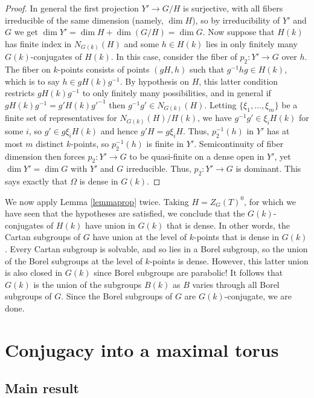 \documentclass[10pt]{article}
\renewcommand{\(}{\left(}
\renewcommand{\)}{\right)}
\numberwithin{thm}{subsection}
\begin{document}
\begin{proof}
In general the first projection $Y' \rightarrow G/H$ is surjective, with all fibers
irreducible of the same dimension (namely, $\dim H$), so 
by irreducibility of $Y'$ and $G$ we get $\dim Y' = \dim H + \dim(G/H) = \dim G$.
Now suppose that $H(k)$ has finite index in $N_{G(k)}(H)$
and some $h \in H(k)$ lies in only finitely many $G(k)$-conjugates of $H(k)$. 
In this case, consider the fiber of $p_2:Y' \rightarrow G$ over $h$.
The fiber on $k$-points consists of points $(gH,h)$ such that $g^{-1}hg \in H(k)$,
which is to say $h \in gH(k)g^{-1}$.    By hypothesis on $H$, this latter condition
restricts $gH(k)g^{-1}$ to only finitely many possibilities,
and in general if $gH(k)g^{-1} = g' H(k) {g'}^{-1}$ then 
$g^{-1}g' \in N_{G(k)}(H)$.   Letting $\{\xi_1,\dots,\xi_m\}$ be
a finite set of representatives for $N_{G(k)}(H)/H(k)$, we have
$g^{-1}g' \in \xi_i H(k)$ for some $i$, so $g' \in  g\xi_i H(k)$ and
hence $g'H = g\xi_i H$.   Thus, $p_2^{-1}(h)$ in $Y'$ has at most $m$ distinct
$k$-points, so $p_2^{-1}(h)$ is finite in $Y'$.  Semicontinuity of fiber dimension
then forces $p_2:Y' \rightarrow G$ to be quasi-finite on a dense
open in $Y'$, yet $\dim Y' = \dim G$ with $Y'$ and $G$ irreducible.
Thus, $p_2:Y' \rightarrow G$ is dominant.  This says exactly that
$\Omega$ is dense in $G(k)$. 
\end{proof}

We now apply Lemma \ref{lemmaprop} twice. 
Taking $H = Z_G(T)^0$, for which we have seen
that the hypotheses are satisfied,  we conclude
that the $G(k)$-conjugates of $H(k)$ have union in $G(k)$ that is dense.
In other words, the Cartan subgroups of $G$ have union at the level of
$k$-points that is dense in $G(k)$.   Every Cartan subgroup is solvable,
and so lies in a Borel subgroup, so the union of the Borel subgroups 
at the level of $k$-points is dense.  However, this latter union is also
closed in $G(k)$ since Borel subgroups are parabolic!
It follows that $G(k)$ is the union of the subgroups $B(k)$ as
$B$ varies through all Borel subgroups of $G$.
Since the Borel subgroups of $G$ are $G(k)$-conjugate, we are done. 


\section{Conjugacy into a maximal torus}\label{conjtorus}

\subsection{Main result}
\end{document}
